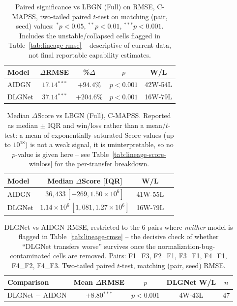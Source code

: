 \begin{table}[t]
\centering
\footnotesize
\caption{Paired significance vs LBGN (Full) on RMSE, C-MAPSS, two-tailed paired $t$-test on matching (pair, seed) values: $^{*}p{<}0.05$, $^{**}p{<}0.01$, $^{***}p{<}0.001$. Includes the unstable/collapsed cells flagged in Table~\ref{tab:lineage-rmse} -- descriptive of current data, not final reportable capability estimates.}
\label{tab:lineage-sig-rmse}
\begin{tabular}{lcccc}
\toprule
Model & $\Delta$RMSE & \%$\Delta$ & $p$ & W/L \\
\midrule
AIDGN & $17.14$$^{***}$ & $+94.4\%$ & $p{<}0.001$ & 42W-54L \\
DLGNet & $37.14$$^{***}$ & $+204.6\%$ & $p{<}0.001$ & 16W-79L \\
\bottomrule
\end{tabular}
\end{table}

\begin{table}[t]
\centering
\footnotesize
\caption{Median $\Delta$Score vs LBGN (Full), C-MAPSS. Reported as median $\pm$ IQR and win/loss rather than a mean/$t$-test: a mean of exponentially-saturated Score values (up to $10^{18}$) is not a weak signal, it is uninterpretable, so no $p$-value is given here -- see Table~\ref{tab:lineage-score-winloss} for the per-transfer breakdown.}
\label{tab:lineage-sig-score}
\begin{tabular}{lccc}
\toprule
Model & Median $\Delta$Score [IQR] & W/L \\
\midrule
AIDGN & $36,433\,[-269,1.50\times10^{6}]$ & 41W-55L \\
DLGNet & $1.14\times10^{6}\,[1,081,1.27\times10^{6}]$ & 16W-79L \\
\bottomrule
\end{tabular}
\end{table}

\begin{table}[t]
\centering
\footnotesize
\caption{DLGNet vs AIDGN RMSE, restricted to the 6 pairs where \emph{neither} model is flagged in Table~\ref{tab:lineage-rmse} -- the decisive check of whether ``DLGNet transfers worse'' survives once the normalization-bug-contaminated cells are removed. Pairs: F1_F3, F2_F1, F3_F1, F4_F1, F4_F2, F4_F3. Two-tailed paired $t$-test, matching (pair, seed) RMSE.}
\label{tab:lineage-clean}
\begin{tabular}{lcccc}
\toprule
Comparison & Mean $\Delta$RMSE & $p$ & DLGNet W/L & $n$ \\
\midrule
DLGNet $-$ AIDGN & $+8.80$$^{***}$ & $p{<}0.001$ & 4W-43L & 47 \\
\bottomrule
\end{tabular}
\end{table}
